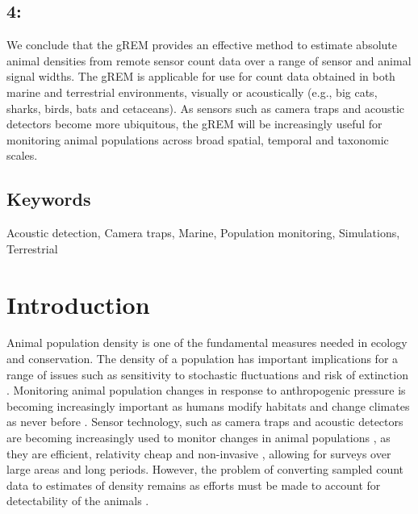\documentclass[a4paper,10pt,reqno,oneside]{amsart}
\begin{document}
\subsection*{4:} We conclude that the gREM provides an effective method to estimate absolute animal densities from remote sensor count data over a range of sensor and animal signal widths. The gREM is applicable for use for count data obtained in both marine and terrestrial environments, visually or acoustically (e.g., big cats, sharks, birds, bats and cetaceans). As sensors such as camera traps and acoustic detectors become more ubiquitous, the gREM will be increasingly useful for monitoring animal populations across broad spatial, temporal and taxonomic scales. 

\subsection{Keywords} %
Acoustic detection, Camera traps, Marine, Population monitoring, Simulations, Terrestrial 

\section{Introduction}

Animal population density is one of the fundamental measures needed in ecology and conservation. The density of a population has important implications for a range of issues such as sensitivity to stochastic fluctuations \citep{richter1972extinction, wright1983stochastic} and risk of extinction \citep{purvis2000predicting}. Monitoring animal population changes in response to anthropogenic pressure is becoming increasingly important as humans modify habitats and change climates as never before \citep{everatt2014trophic}. %
Sensor technology, such as camera traps \citep{rowcliffe2008surveys, karanth1995estimating} and acoustic detectors \citep{ofarrel1999comparison, clark1995application, acevedo2006using} are becoming increasingly used to monitor changes in animal populations \citep{rowcliffe2008surveys, kessel2014review}, as they are efficient, relativity cheap and non-invasive \citep{cutler1999using}, allowing for surveys over large areas and long periods. However, the problem of converting sampled count data to estimates of density remains as efforts must be made to account for detectability of the animals \citep{anderson2001need}.
\end{document}
